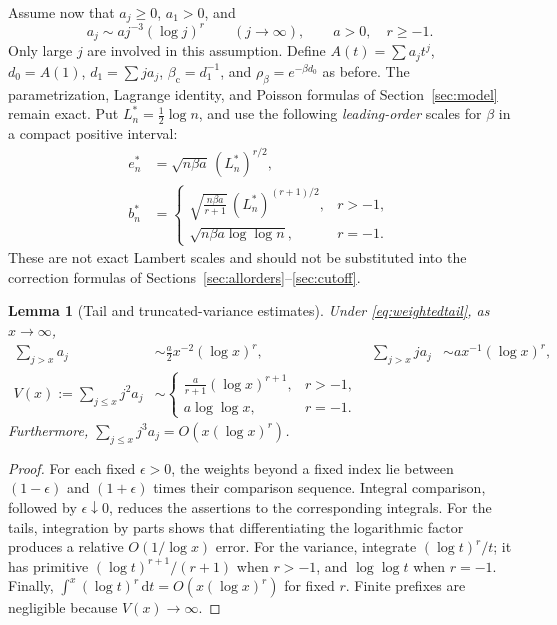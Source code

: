 \documentclass[11pt,a4paper]{article}
\numberwithin{equation}{section}
\newtheorem{lemma}[theorem]{Lemma}
\theoremstyle{definition}
\theoremstyle{remark}
\newcommand{\dd}{\,\mathrm d}
\newcommand{\bc}{\beta_{\mathrm c}}
\begin{document}
Assume now that $a_j\ge0$, $a_1>0$, and
\begin{equation}\label{eq:weightedtail}
 a_j\sim a j^{-3}(\log j)^r\qquad(j\to\infty),
 \qquad a>0,\quad r\ge-1.
\end{equation}
Only large $j$ are involved in this assumption. Define $A(t)=\sum a_jt^j$,
$d_0=A(1)$, $d_1=\sum j a_j$, $\bc=d_1^{-1}$, and
$\rho_\beta=e^{-\beta d_0}$ as before. The parametrization, Lagrange
identity, and Poisson formulas of Section~\ref{sec:model} remain exact.
Put $L_n^*=\tfrac12\log n$, and use the following \emph{leading-order}
scales for $\beta$ in a compact positive interval:
\begin{align}
 e_n^*&=\sqrt{n\beta a}\,(L_n^*)^{r/2},\label{eq:weightedextreme}\\
 b_n^*&=
 \begin{cases}
 \displaystyle\sqrt{\frac{n\beta a}{r+1}}\,
                (L_n^*)^{(r+1)/2},&r>-1,\\[3pt]
 \displaystyle\sqrt{n\beta a\log\log n},&r=-1.
 \end{cases}\label{eq:weightednormal}
\end{align}
These are not exact Lambert scales and should not be substituted into
the correction formulas of Sections~\ref{sec:allorders}--\ref{sec:cutoff}.

\begin{lemma}[Tail and truncated-variance estimates]
\label{lem:weightedtails}
Under \eqref{eq:weightedtail}, as $x\to\infty$,
\begin{align}
 \sum_{j>x}a_j&\sim\frac a2 x^{-2}(\log x)^r,
 &\sum_{j>x}j a_j&\sim a x^{-1}(\log x)^r,\label{eq:weightedtails}\\
 V(x):=\sum_{j\le x}j^2a_j&\sim
 \begin{cases}
 \displaystyle\frac a{r+1}(\log x)^{r+1},&r>-1,\\[3pt]
 a\log\log x,&r=-1.
 \end{cases}\label{eq:weightedvariance}
\end{align}
Furthermore, $\sum_{j\le x}j^3a_j=O(x(\log x)^r)$.
\end{lemma}
\begin{proof}
For each fixed $\epsilon>0$, the weights beyond a fixed index lie
between $(1-\epsilon)$ and $(1+\epsilon)$ times their comparison
sequence. Integral comparison, followed by $\epsilon\downarrow0$,
reduces the assertions to the corresponding integrals. For the tails,
integration by parts shows that differentiating the logarithmic factor
produces a relative $O(1/\log x)$ error. For the variance, integrate
$(\log t)^r/t$; it has primitive $(\log t)^{r+1}/(r+1)$ when
$r>-1$, and $\log\log t$ when $r=-1$. Finally,
$\int^x(\log t)^r\dd t=O(x(\log x)^r)$ for fixed $r$.
Finite prefixes are negligible because $V(x)\to\infty$.
\end{proof}
\end{document}
